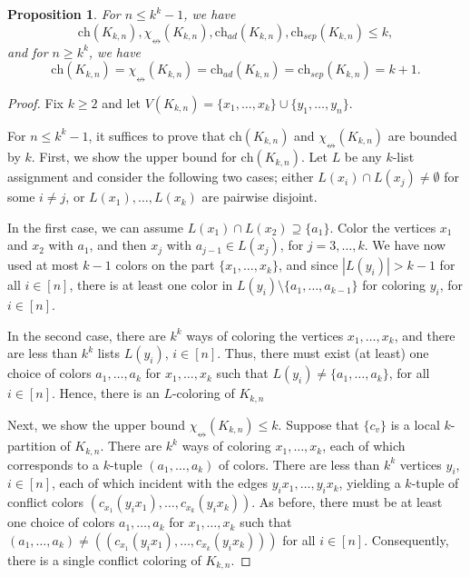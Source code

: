 \documentclass[12pt]{article}
\newtheorem{proposition}[theorem]{Proposition}
\newcommand{\ch}{\mathrm{ch}}
\newcommand{\chsep}{\mathrm{ch}_{sep}}
\newcommand{\chad}{\mathrm{ch}_{ad}}
\newcommand{\sing}{\chi_{\nleftrightarrow}}
\begin{document}
\begin{proposition} 
\label{Lemma: Bipartite invariants k -> k+1}
\newcommand{\kkn}{K_{k,n}} 
For $n\leq k^k-1$, we have
$$
\ch(\kkn),\sing(\kkn),\chad(\kkn),\chsep(\kkn)\leq k,
$$
and for $n\geq k^k$, we have
$$
\ch(\kkn)=\sing(\kkn)=\chad(\kkn)=\chsep(\kkn)=k+1.
$$
\end{proposition}
\begin{proof}
\newcommand{\kkn}{K_{k,n}}
\newcommand{\K}{K_{k, k^k}}

    Fix $k\geq 2$ and let $V(\kkn)=\{x_1, \dots, x_k\}\cup\{y_1, \dots, y_n\}$. 

    For $n\leq k^k-1$, it suffices to prove that $\ch(\kkn)$ and $\sing(\kkn)$ are bounded by $k$. First, we show the upper bound for $\ch(\kkn)$. Let $L$ be any $k$-list assignment and consider the following two cases; either $L(x_i)\cap L(x_j)\neq \emptyset$ for some $i\neq j$, or $L(x_1), \dots, L(x_k)$ are pairwise disjoint.

    In the first case, we can assume $L(x_1)\cap L(x_2)\supseteq \{a_1\}$. Color the vertices $x_1$ and $x_2$ with $a_1$, and then $x_j$ with $a_{j-1}\in L(x_j)$, for $j=3,\dots, k$. We have now used at most $k-1$ colors on the part $\{x_1,\dots, x_k\}$, and since $|L(y_i)|>k-1$ for all $i\in [n]$, there is at least one color in $ L(y_i)\setminus \{a_1,\dots, a_{k-1}\}$ for coloring $y_i$, for $i\in [n]$.

    In the second case, there are $k^k$ ways of coloring the vertices $x_1,\dots, x_k$, and there are less than $k^k$ lists $L(y_i)$, $i\in [n]$. Thus, there must exist (at least) one choice of colors $a_1,\dots, a_k$ for $x_1,\dots, x_k$ such that $L(y_i)\neq \{a_1, \dots, a_k\}$, for all $i\in [n]$. %
Hence, there is an $L$-coloring of $K_{k,n}$

    Next, we show the upper bound $\sing(\kkn)\leq k$. Suppose that $\{c_v\}$ is a local $k$-partition of $\kkn$. There are $k^k$ ways of coloring $x_1,\dots, x_k$, each of which corresponds to a $k$-tuple $(a_1,\dots, a_k)$ of colors. There are less than $k^k$ vertices $y_i$, $i\in [n]$, each of which incident with the edges $y_ix_1, \dots, y_ix_k$, yielding a $k$-tuple of conflict colors $(c_{x_1}(y_ix_1), \dots, c_{x_k}(y_ix_k))$. As before, there must be at least one choice of colors $a_1, \dots, a_k$ for $x_1, \dots, x_k$ such that $(a_1,\dots, a_k)\neq ((c_{x_1}(y_ix_1), \dots, c_{x_k}(y_ix_k)))$ for all $i\in [n]$. Consequently, there is a single conflict coloring of $K_{k,n}$.


\end{proof}
\end{document}
